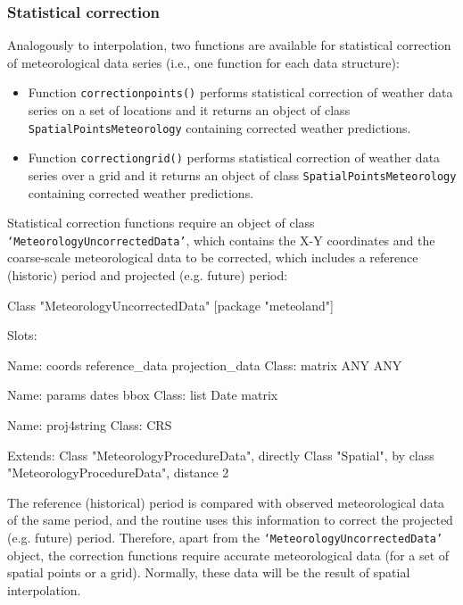 \documentclass[11pt,a4paper]{article}
\begin{document}
\subsubsection{Statistical correction}
Analogously to interpolation, two functions are available for statistical correction of meteorological data series (i.e., one function for each data structure):
\begin{itemize}
\item{Function \texttt{correctionpoints()} performs statistical correction of weather data series on a set of locations and it returns an object of class \texttt{SpatialPointsMeteorology} containing corrected weather predictions.}
\item{Function \texttt{correctiongrid()} performs statistical correction of weather data series over a grid and it returns an object of class \texttt{SpatialPointsMeteorology} containing corrected weather predictions.}
\end{itemize}
Statistical correction functions require an object of class \texttt{`MeteorologyUncorrectedData'}, which contains the X-Y coordinates and the coarse-scale meteorological data to be corrected, which includes a reference (historic) period and projected (e.g. future) period:
\begin{Schunk}
\begin{Soutput}
Class "MeteorologyUncorrectedData" [package "meteoland"]

Slots:
                                                      
Name:           coords  reference_data projection_data
Class:          matrix             ANY             ANY
                                                      
Name:           params           dates            bbox
Class:            list            Date          matrix
                      
Name:      proj4string
Class:             CRS

Extends: 
Class "MeteorologyProcedureData", directly
Class "Spatial", by class "MeteorologyProcedureData", distance 2
\end{Soutput}
\end{Schunk}
The reference (historical) period is compared with observed meteorological data of the same period, and the routine uses this information to correct the projected (e.g. future) period. Therefore, apart from the \texttt{`MeteorologyUncorrectedData'} object, the correction functions require accurate meteorological data (for a set of spatial points or a grid). Normally, these data will be the result of spatial interpolation.
\end{document}
